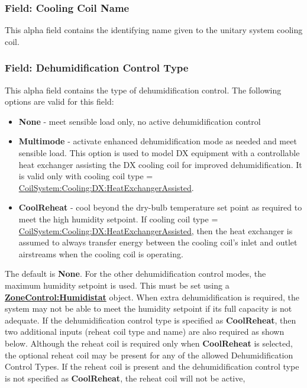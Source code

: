 \subsubsection{Field: Cooling Coil Name}\label{field-cooling-coil-name-2-000}

This alpha field contains the identifying name given to the unitary system cooling coil.

\subsubsection{Field: Dehumidification Control Type}\label{field-dehumidification-control-type-2-000}

This alpha field contains the type of dehumidification control. The following options are valid for this field:

\begin{itemize}
\item
  \textbf{None} - meet sensible load only, no active dehumidification control
\item
  \textbf{Multimode} - activate enhanced dehumidification mode as needed and meet sensible load. This option is used to model DX equipment with a controllable heat exchanger assisting the DX cooling coil for improved dehumidification. It is valid only with cooling coil type = \hyperref[coilsystemcoolingdxheatexchangerassisted]{CoilSystem:Cooling:DX:HeatExchangerAssisted}.
\item
  \textbf{CoolReheat} - cool beyond the dry-bulb temperature set point as required to meet the high humidity setpoint. If cooling coil type = \hyperref[coilsystemcoolingdxheatexchangerassisted]{CoilSystem:Cooling:DX:HeatExchangerAssisted}, then the heat exchanger is assumed to always transfer energy between the cooling coil's inlet and outlet airstreams when the cooling coil is operating.
\end{itemize}

The default is \textbf{None}. For the other dehumidification control modes, the maximum humidity setpoint is used. This must be set using a \textbf{\hyperref[zonecontrolhumidistat]{ZoneControl:Humidistat}} object. When extra dehumidification is required, the system may not be able to meet the humidity setpoint if its full capacity is not adequate. If the dehumidification control type is specified as \textbf{CoolReheat}, then two additional inputs (reheat coil type and name) are also required as shown below. Although the reheat coil is required only when \textbf{CoolReheat} is selected, the optional reheat coil may be present for any of the allowed Dehumidification Control Types. If the reheat coil is present and the dehumidification control type is not specified as \textbf{CoolReheat}, the reheat coil will not be active,

